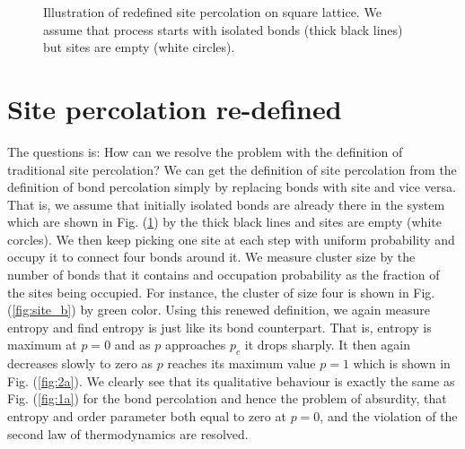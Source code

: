 \documentclass[twocolumn,showpacs,preprintnumbers,amsmath,amssymb]{article}
\begin{document}
\begin{figure}

\centering



\subfloat[]
{
\label{fig:site_b}
}

\caption{Illustration of redefined site percolation on square lattice. We assume that process
starts with isolated bonds (thick black 
lines)  but sites are empty (white circles).
} 

\label{fig:site_ab}
\end{figure}



\section{Site percolation re-defined}

The questions is: How can we resolve the problem with the definition of traditional site percolation?
We can get the definition of site percolation
from the definition of bond percolation simply by replacing bonds with site and vice versa.
That is, we assume that initially isolated bonds are already
there in the system which are shown in Fig. (\ref{fig:site_ab}) by the thick black lines and sites
are empty (white corcles). We then keep picking one site at each step with uniform probability
and occupy it to connect four bonds around it.   
We measure cluster size by the number of bonds that it contains and occupation probability as the fraction of the sites
being occupied. For instance, the cluster of size four is shown in Fig. (\ref{fig:site_b}) by green color.
Using this renewed definition, we again measure entropy and find entropy is just like
its bond counterpart. That is, entropy is 
maximum at $p=0$ and  as $p$ approaches $p_c$ it drops sharply. It then again decreases slowly
to zero as $p$ reaches its maximum value $p=1$ which is shown in Fig. (\ref{fig:2a}). We
clearly see that its qualitative behaviour is exactly the same as   Fig. (\ref{fig:1a}) for the bond 
percolation and hence the problem of absurdity, that entropy and order parameter both
equal to zero at $p=0$, and the violation of the second law of thermodynamics are resolved.
\end{document}
